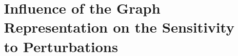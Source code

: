 

\clearpage
\section{Influence of the Graph Representation on the Sensitivity to
Perturbations}\label{sec:results_sensitivity}

